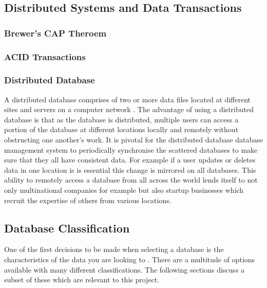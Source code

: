 \subsection{Distributed Systems and Data Transactions}\label{distrosystems}

\subsubsection{Brewer's CAP Theroem}\label{captheroem}
\subsubsection{ACID Transactions}\label{acid}
\subsubsection{Distributed Database}\label{distributeddb}
A distributed database comprises of two or more data files located at different sites and servers on a computer network \cite{dd}. The advantage of using a distributed database is that as the database is distributed, multiple users can access a portion of the database at different locations locally and remotely without obstructing one another's work. It is  pivotal for the distributed database database management system to periodically synchronise the scattered databases to make sure that they all have consistent data.  \cite{dd} For example if a user updates or deletes data in one location is is essential this change is mirrored on all databases. This ability to remotely access a database from all across the world lends itself to not only multinational companies for example but also startup businesses which recruit the expertise of others from various locations.

\subsection{Database Classification}\label{dbclass}
One of the first decisions to be made when selecting a database is the characteristics of the data you are looking to . \cite{nosql2} There are a multitude of options available with many different classifications. The following sections discuss a subset of these which are relevant to this project.

